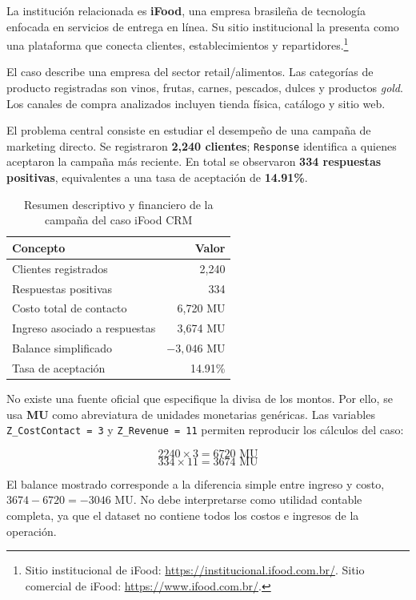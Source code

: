 \documentclass[12pt]{article}
\begin{document}
La institución relacionada es \textbf{iFood}, una empresa brasileña de tecnología enfocada en servicios de entrega en línea. Su sitio institucional la presenta como una plataforma que conecta clientes, establecimientos y repartidores.\footnote{Sitio institucional de iFood: \url{https://institucional.ifood.com.br/}. Sitio comercial de iFood: \url{https://www.ifood.com.br/}.}

El caso describe una empresa del sector retail/alimentos. Las categorías de producto registradas son vinos, frutas, carnes, pescados, dulces y productos \textit{gold}. Los canales de compra analizados incluyen tienda física, catálogo y sitio web.

El problema central consiste en estudiar el desempeño de una campaña de marketing directo. Se registraron \textbf{2{,}240 clientes}; \texttt{Response} identifica a quienes aceptaron la campaña más reciente. En total se observaron \textbf{334 respuestas positivas}, equivalentes a una tasa de aceptación de \textbf{14.91\%}.

\begin{table}[h!]
\centering
\small
\begin{tabular}{|l|r|}
\hline
\rowcolor{escom-azul!20}
\textbf{Concepto} & \textbf{Valor} \\
\hline
Clientes registrados & 2{,}240 \\
\hline
Respuestas positivas & 334 \\
\hline
Costo total de contacto & 6{,}720 MU \\
\hline
Ingreso asociado a respuestas & 3{,}674 MU \\
\hline
Balance simplificado & $-3{,}046$ MU \\
\hline
Tasa de aceptación & 14.91\% \\
\hline
\end{tabular}
\caption{Resumen descriptivo y financiero de la campaña del caso iFood CRM}
\label{tab:piloto_ifood}
\end{table}

No existe una fuente oficial que especifique la divisa de los montos. Por ello, se usa \textbf{MU} como abreviatura de unidades monetarias genéricas. Las variables \texttt{Z\_CostContact = 3} y \texttt{Z\_Revenue = 11} permiten reproducir los cálculos del caso:

\[
2240 \times 3 = 6720 \text{ MU}
\]
\[
334 \times 11 = 3674 \text{ MU}
\]

El balance mostrado corresponde a la diferencia simple entre ingreso y costo, $3674-6720=-3046$ MU. No debe interpretarse como utilidad contable completa, ya que el dataset no contiene todos los costos e ingresos de la operación.
\end{document}
